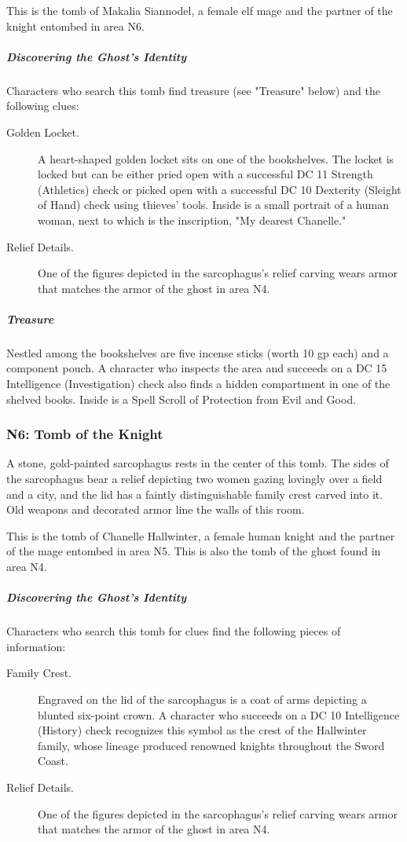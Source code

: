 \documentclass[10pt,a4paper,twoside,bg=print,twocolumn,openany,nodeprecatedcode]{dndbook}
\begin{document}
This is the tomb of Makalia Siannodel, a female elf mage and the partner of the knight entombed in area N6.

\subparagraph{Discovering the Ghost's Identity}
Characters who search this tomb find treasure (see "Treasure" below) and the following clues:

\begin{description}
\item[Golden Locket.]
A heart-shaped golden locket sits on one of the bookshelves. The locket is locked but can be either pried open with a successful DC 11 Strength (Athletics) check or picked open with a successful DC 10 Dexterity (Sleight of Hand) check using thieves' tools. Inside is a small portrait of a human woman, next to which is the inscription, "My dearest Chanelle."
\item[Relief Details.]
One of the figures depicted in the sarcophagus's relief carving wears armor that matches the armor of the ghost in area N4.
\end{description}

\subparagraph{Treasure}
Nestled among the bookshelves are five incense sticks (worth 10 gp each) and a component pouch. A character who inspects the area and succeeds on a DC 15 Intelligence (Investigation) check also finds a hidden compartment in one of the shelved books. Inside is a Spell Scroll of Protection from Evil and Good.
\subsubsection{N6: Tomb of the Knight}
\begin{DndReadAloud}{}
A stone, gold-painted sarcophagus rests in the center of this tomb. The sides of the sarcophagus bear a relief depicting two women gazing lovingly over a field and a city, and the lid has a faintly distinguishable family crest carved into it. Old weapons and decorated armor line the walls of this room.
\end{DndReadAloud}

This is the tomb of Chanelle Hallwinter, a female human knight and the partner of the mage entombed in area N5. This is also the tomb of the ghost found in area N4.
\subparagraph{Discovering the Ghost's Identity}
Characters who search this tomb for clues find the following pieces of information:

\begin{description}
\item[Family Crest.]
Engraved on the lid of the sarcophagus is a coat of arms depicting a blunted six-point crown. A character who succeeds on a DC 10 Intelligence (History) check recognizes this symbol as the crest of the Hallwinter family, whose lineage produced renowned knights throughout the Sword Coast.
\item[Relief Details.]
One of the figures depicted in the sarcophagus's relief carving wears armor that matches the armor of the ghost in area N4.
\end{description}
\end{document}
